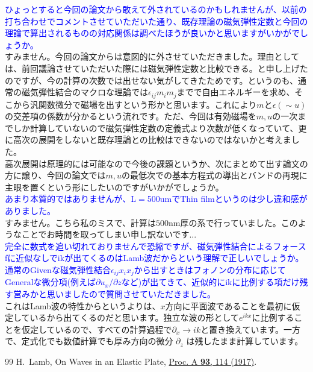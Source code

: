 \documentclass{jsarticle}
\begin{document}
\textcolor{blue}{ひょっとすると今回の論文から敢えて外されているのかもしれませんが、以前の打ち合わせでコメントさせていただいた通り、既存理論の磁気弾性定数と今回の理論で算出されるものの対応関係は調べたほうが良いかと思いますがいかがでしょうか。}\\

すみません。今回の論文からは意図的に外させていただきました。理由としては、前回議論させていただいた際には磁気弾性定数と比較できる。と申し上げたのですが、今の計算の次数では出せない気がしてきたためです。というのも、通常の磁気弾性結合のマクロな理論では$\epsilon_{ij}m_im_j$までで自由エネルギーを求め、そこから汎関数微分で磁場を出すという形かと思います。これにより$m$と$\epsilon (\sim u)$の交差項の係数が分かるという流れです。ただ、今回は有効磁場を$m,u$の一次までしか計算していないので磁気弾性定数の定義式より次数が低くなっていて、更に高次の展開をしないと既存理論との比較はできないのではないかと考えました。\\

高次展開は原理的には可能なので今後の課題というか、次にまとめて出す論文の方に譲り、今回の論文では$m,u$の最低次での基本方程式の導出とバンドの再現に主眼を置くという形にしたいのですがいかがでしょうか。\\

\textcolor{blue}{あまり本質的ではありませんが、L$=$500umでThin filmというのは少し違和感がありました。}\\

すみません。こちら私のミスで、計算は$500$nm厚の系で行っていました。このようなことでお時間を取ってしまい申し訳ないです...\\

\textcolor{blue}{完全に数式を追い切れておりませんで恐縮ですが、磁気弾性結合によるフォースfに近似なしでikが出てくるのはLamb波だからという理解で正しいでしょうか。通常のGivenな磁気弾性結合$\epsilon_{ij} x_i x_j$から出すときはフォノンの分布に応じてGeneralな微分項(例えば$\partial u_x/\partial z$など)が出てきて、近似的にikに比例する項だけ残す営みかと思いましたので質問させていただきました。}\\

これはLamb波の特性からというよりは、$x$方向に平面波であることを最初に仮定しているから出てくるのだと思います。独立な波の形として$e^{ikx}$に比例することを仮定しているので、すべての計算過程で$\partial_x\to ik$と置き換えています。一方で、定式化でも数値計算でも厚み方向の微分 $\partial_z$ は残したまま計算しています。


\begin{thebibliography}{99}
H.~Lamb, On Waves in an Elastic Plate, \href{https://doi.org/10.1098/rspa.1917.0008}{Proc. A \textbf{93}, 114 (1917)}.

\end{thebibliography}
\end{document}
